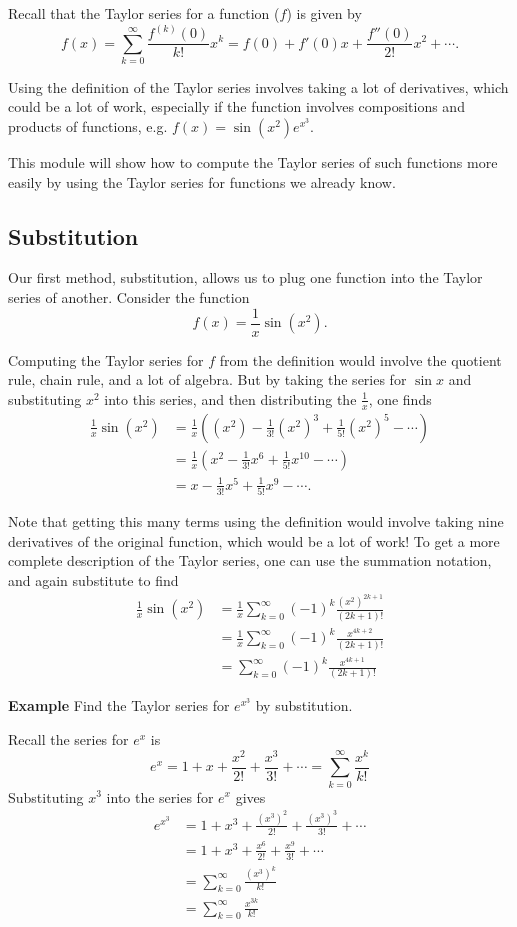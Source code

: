 \documentclass[twoside,openright,titlepage,a4paper]{book}
\begin{document}
\begin{sloppypar}
Recall that the Taylor series for a function ($f$) is given by \[f(x)=\sum_{k=0}^\infty \frac{f^{\left(k\right)}(0)}{k!} x^k=f(0)+f'(0)x+\frac{f''(0)}{2!} x^2+\dotsb.\]

Using the definition of the Taylor series involves taking a lot of derivatives, which could be a lot of work, especially if the function involves compositions and products of functions, e.g. ${f(x)=\sin(x^2)e^{x^3}}$.

This module will show how to compute the Taylor series of such functions more easily by using the Taylor series for functions we already know.

\subsection{Substitution}
Our first method, substitution, allows us to plug one function into the Taylor series of another. Consider the function \[f(x)=\frac{1}{x}\sin(x^2).\]

Computing the Taylor series for $f$ from the definition would involve the quotient rule, chain rule, and a lot of algebra. But by taking the series for ${\sin x}$ and substituting $x^2$ into this series, and then distributing the ${\frac{1}{x}}$, one finds
\begin{align*}
\frac{1}{x}\sin(x^2)&=\frac{1}{x}\left((x^2)-\frac{1}{3!}(x^2)^3+\frac{1}{5!}(x^2)^5-\dotsb\right) \\
&=\frac{1}{x}\left(x^2-\frac{1}{3!}x^6+\frac{1}{5!}x^{10}-\dotsb\right) \\
&=x-\frac{1}{3!}x^5+\frac{1}{5!}x^9-\dotsb. 
\end{align*}

Note that getting this many terms using the definition would involve taking nine derivatives of the original function, which would be a lot of work! To get a more complete description of the Taylor series, one can use the summation notation, and again substitute to find
\begin{align*}
\frac{1}{x} \sin(x^2) &= \frac{1}{x} \sum_{k=0}^\infty (-1)^k \frac{(x^2)^{2k+1}}{(2k+1)!} \\
&= \frac{1}{x} \sum_{k=0}^\infty (-1)^k \frac{x^{4k+2}}{(2k+1)!} \\
&= \sum_{k=0}^\infty (-1)^k \frac{x^{4k+1}}{(2k+1)!}
\end{align*}

\textbf{Example} Find the Taylor series for ${e^{x^3}}$ by substitution.
\begin{examplebox}
Recall the series for $e^x$ is \[e^x=1+x+\frac{x^2}{2!}+\frac{x^3}{3!}+\dotsb=\sum_{k=0}^\infty\frac{x^k}{k!}\]
Substituting $x^3$ into the series for $e^x$ gives
\begin{align*}
e^{x^3} &= 1 + x^3 + \frac{(x^3)^2}{2!} + \frac{(x^3)^3}{3!} + \dotsb \\
&= 1 + x^3 + \frac{x^6}{2!} + \frac{x^9}{3!} + \dotsb \\
&= \sum_{k=0}^\infty \frac{(x^3)^k}{k!} \\
&= \sum_{k=0}^\infty \frac{x^{3k}}{k!}
\end{align*}
\end{examplebox}


\end{sloppypar}
\end{document}
